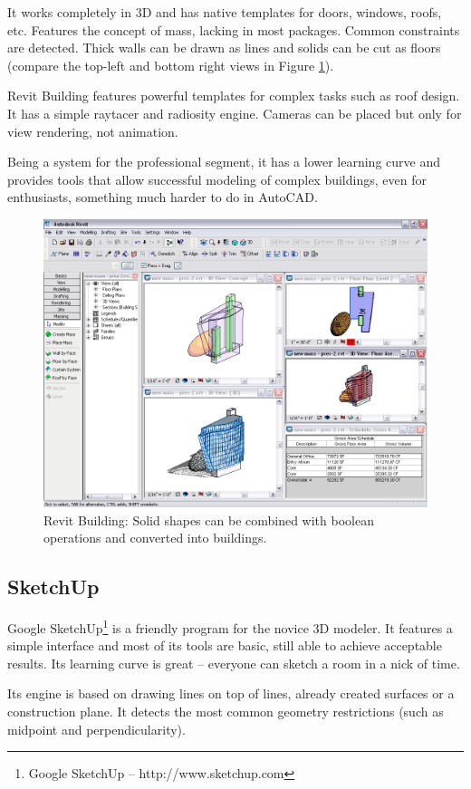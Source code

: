 It works completely in 3D and has native templates for doors, windows, roofs, etc.
Features the concept of mass, lacking in most packages.
Common constraints are detected. Thick walls can be drawn as lines and solids can
be cut as floors (compare the top-left and bottom right views in Figure \ref{FIG-REVIT}).

Revit Building features powerful templates for complex tasks such as roof design.
It has a simple raytacer and radiosity engine. Cameras can be placed but only for view
rendering, not animation.

Being a system for the professional segment, it has a lower learning curve and provides
tools that allow successful modeling of complex buildings, even for enthusiasts,
something much harder to do in AutoCAD.

\begin{figure}[!ht]
    \centering
    \includegraphics[width=12cm]{gfx/revit-1.png}
    \caption{Revit Building: Solid shapes can be combined with boolean operations and converted into buildings.}
    \label{FIG-REVIT}
\end{figure}

\subsection{SketchUp}
\nocite{SITE-SKETCHUP}
Google SketchUp\footnote{Google SketchUp -- http://www.sketchup.com}
is a friendly program for the novice 3D modeler.
It features a simple interface and most of its tools are basic,
still able to achieve acceptable results.
Its learning curve is great -- everyone can sketch a room in a nick of time.

Its engine is based on drawing lines on top of lines,
already created surfaces or a construction plane.
It detects the most common geometry restrictions (such as midpoint and perpendicularity).

